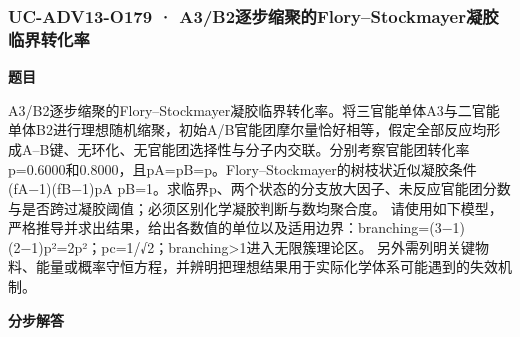 \documentclass[UTF8,11pt,a4paper]{ctexart}
\begin{document}
\subsubsection*{UC-ADV13-O179 · A3/B2逐步缩聚的Flory–Stockmayer凝胶临界转化率}
\noindent\textbf{题目}\par
A3/B2逐步缩聚的Flory–Stockmayer凝胶临界转化率。将三官能单体A3与二官能单体B2进行理想随机缩聚，初始A/B官能团摩尔量恰好相等，假定全部反应均形成A–B键、无环化、无官能团选择性与分子内交联。分别考察官能团转化率p=0.6000和0.8000，且pA=pB=p。Flory–Stockmayer的树枝状近似凝胶条件(fA−1)(fB−1)pA pB=1。求临界p、两个状态的分支放大因子、未反应官能团分数与是否跨过凝胶阈值；必须区别化学凝胶判断与数均聚合度。 请使用如下模型，严格推导并求出结果，给出各数值的单位以及适用边界：branching=(3−1)(2−1)p²=2p²；pc=1/√2；branching>1进入无限簇理论区。 另外需列明关键物料、能量或概率守恒方程，并辨明把理想结果用于实际化学体系可能遇到的失效机制。\par
\medskip\noindent\textbf{分步解答}
\end{document}
